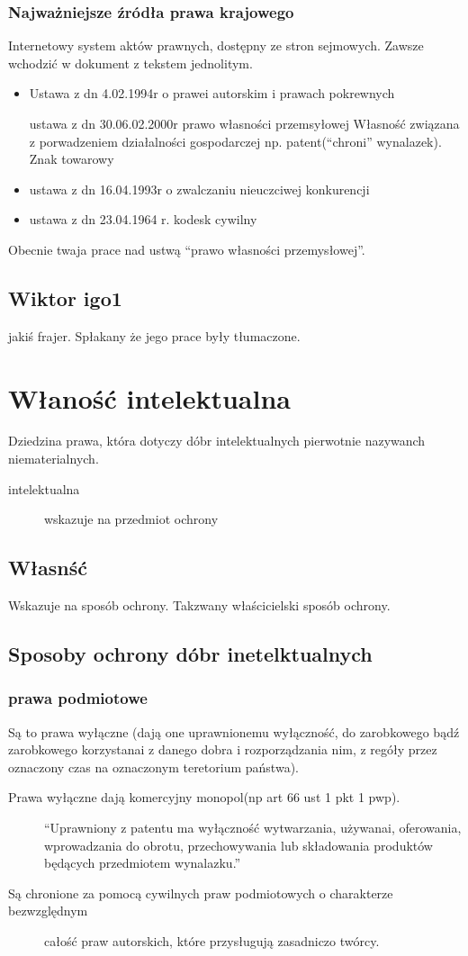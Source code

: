 \documentclass[11pt]{article}
\begin{document}
\subsubsection{Najważniejsze źródła prawa krajowego}
\label{sec:org4627c61}
Internetowy system aktów prawnych, dostępny ze stron sejmowych. Zawsze wchodzić w dokument z tekstem jednolitym.
\begin{itemize}
\item Ustawa z dn 4.02.1994r o prawei autorskim i prawach pokrewnych
\item[{ustawa z dn 30.06.02.2000r prawo własności przemsyłowej}] Własność związana z porwadzeniem działalności gospodarczej np. patent(``chroni'' wynalazek). Znak towarowy
\item ustawa z dn 16.04.1993r o zwalczaniu nieuczciwej konkurencji
\item ustawa z dn 23.04.1964 r. kodesk cywilny
\end{itemize}
Obecnie twaja prace nad ustwą ``prawo własności przemysłowej''.
\subsection{Wiktor igo1}
\label{sec:org4fb20fd}
jakiś frajer. Spłakany że jego prace były tłumaczone.
\section{Właność intelektualna}
\label{sec:orgc91c624}
Dziedzina prawa, która dotyczy dóbr intelektualnych pierwotnie nazywanch niematerialnych.
\begin{description}
\item[{intelektualna}] wskazuje na przedmiot ochrony
\end{description}
\subsection{Własnść}
\label{sec:org8fd27dc}
Wskazuje na sposób ochrony.
Takzwany właścicielski sposób ochrony.
\subsection{Sposoby ochrony dóbr inetelktualnych}
\label{sec:org46b7b14}
\subsubsection{prawa podmiotowe}
\label{sec:orge6da441}
Są to prawa wyłączne (dają one uprawnionemu wyłączność, do zarobkowego bądź zarobkowego korzystanai z danego dobra i rozporządzania nim, z regóły przez oznaczony czas na oznaczonym teretorium państwa).
\begin{description}
\item[{Prawa wyłączne dają komercyjny monopol(np art 66 ust 1 pkt 1 pwp).}] ``Uprawniony z patentu ma wyłączność wytwarzania, używanai, oferowania, wprowadzania do obrotu, przechowywania lub składowania produktów będących przedmiotem wynalazku.''
\item[{Są chronione za pomocą cywilnych praw podmiotowych o charakterze bezwzględnym}] całość praw autorskich, które przysługują zasadniczo twórcy.
\end{description}
\end{document}
